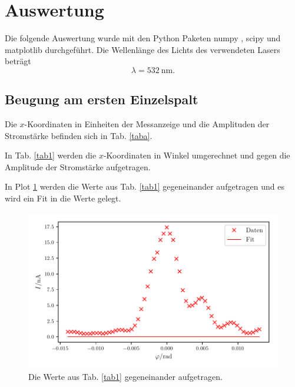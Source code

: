 \section{Auswertung}
\label{sec:Auswertung}

Die folgende Auswertung wurde mit den Python Paketen numpy \cite{numpy}, scipy \cite{scipy} und matplotlib \cite{matplotlib} durchgeführt. 
\newline
Die Wellenlänge des Lichts des verwendeten Lasers beträgt
\begin{equation*}
    \lambda = \SI{532}{\nano\meter}. %
\end{equation*}
\subsection{Beugung am ersten Einzelspalt}
Die $x$-Koordinaten in Einheiten der Messanzeige und die Amplituden der Stromstärke befinden sich in Tab. \ref{taba}. 



\noindent In Tab. \ref{tab1} werden die $x$-Koordinaten in Winkel umgerechnet und gegen die Amplitude der Stromstärke aufgetragen.



\noindent  In Plot \ref{fig:plot1} werden die Werte aus Tab. \ref{tab1} gegeneinander aufgetragen und es wird ein Fit in die Werte gelegt. 

\begin{figure}
    \centering
    \includegraphics[width=12cm, height=7cm]{build/plot1.pdf}
    \caption{Die Werte aus Tab. \ref{tab1} gegeneinander aufgetragen.}
    \label{fig:plot1}
\end{figure}

